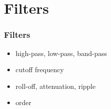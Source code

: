 
\section{Filters}

\begin{frame}
	\frametitle{Filters}
	\begin{itemize}
		\item high-pass, low-pass, band-pass
		\item cutoff frequency
		\item roll-off, attenuation, ripple
		\item order
	\end{itemize}
\end{frame}

